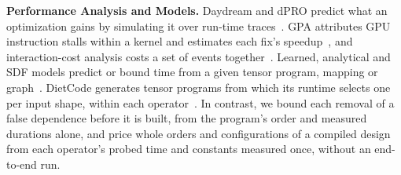 \textbf{Performance Analysis and Models.}
Daydream and dPRO predict what an optimization gains by simulating it over run-time traces~\citep{zhu2020daydream,hu2022dpro}.
GPA attributes GPU instruction stalls within a kernel and estimates each fix's speedup~\citep{zhou2021gpa}, and interaction-cost analysis costs a set of events together~\citep{fields2003interaction}.
Learned, analytical and SDF models predict or bound time from a given tensor program, mapping or graph~\citep{kaufman2021learned,parashar2019timeloop,kwon2019maestro,ghamarian2006throughput}.
DietCode generates tensor programs from which its runtime selects one per input shape, within each operator~\citep{zheng2022dietcode}.
In contrast, we bound each removal of a false dependence before it is built, from the program's order and measured durations alone, and price whole orders and configurations of a compiled design from each operator's probed time and constants measured once, without an end-to-end run.
